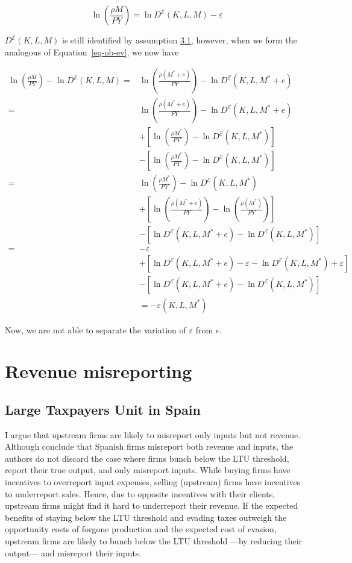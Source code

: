 \documentclass[
  12pt]{article}
\theoremstyle{definition}
\theoremstyle{remark}
\begin{document}
\[
\ln\left(\frac{\rho M}{PY}\right)=\ln D^{\mathcal{E}}(K,L,M)-\varepsilon
\]

\(D^{\mathcal{E}}(K,L,M)\) is still identified by assumption
\hyperref[ass-non-ev]{3.1}, however, when we form the analogous of
Equation~\ref{eq-ob-ev}, we now have

\[
\begin{aligned}
\ln\left(\frac{\rho M}{PY}\right)-\ln D^{\mathcal{E}}(K,L,M)=&\ln\left(\frac{\rho(M^*+e)}{PY}\right)-\ln D^{\mathcal{E}}(K,L,M^*+e)\\
=&\ln\left(\frac{\rho(M^*+e)}{PY}\right)-\ln D^{\mathcal{E}}(K,L,M^*+e)\\
&+\left[\ln\left(\frac{\rho M^*}{PY}\right)-\ln D^{\mathcal{E}}(K,L,M^*)\right]\\
&-\left[\ln\left(\frac{\rho M^*}{PY}\right)-\ln D^{\mathcal{E}}(K,L,M^*)\right] \\
=&\ln\left(\frac{\rho M^*}{PY}\right)-\ln D^{\mathcal{E}}(K,L,M^*) \\
&+\left[\ln\left(\frac{\rho(M^*+e)}{PY}\right)-\ln\left(\frac{\rho(M^*)}{PY}\right)\right]\\
&-\left[\ln D^{\mathcal{E}}(K,L,M^*+e)-\ln D^{\mathcal{E}}(K,L,M^*)\right]\\
=& -\varepsilon \\
&+\left[\ln D^{\mathcal{E}}(K,L,M^*+e)-\varepsilon-\ln D^{\mathcal{E}}(K,L,M^*)+\varepsilon\right]\\
&-\left[\ln D^{\mathcal{E}}(K,L,M^*+e)-\ln D^{\mathcal{E}}(K,L,M^*)\right]\\
&= -\varepsilon(K,L,M^*)
\end{aligned}
\]

Now, we are not able to separate the variation of \(\varepsilon\) from
\(e\).

\section{Revenue misreporting}\label{revenue-misreporting}

\subsection{Large Taxpayers Unit in
Spain}\label{large-taxpayers-unit-in-spain}

I argue that upstream firms are likely to misreport only inputs but not
revenue. Although \citet{Almunia2018} conclude that Spanish firms
misreport both revenue and inputs, the authors do not discard the case
where firms bunch below the LTU threshold, report their true output, and
only misreport inputs. While buying firms have incentives to overreport
input expenses, selling (upstream) firms have incentives to underreport
sales. Hence, due to opposite incentives with their clients, upstream
firms might find it hard to underreport their revenue. If the expected
benefits of staying below the LTU threshold and evading taxes outweigh
the opportunity costs of forgone production and the expected cost of
evasion, upstream firms are likely to bunch below the LTU threshold
---by reducing their output--- and misreport their inputs.
\end{document}
